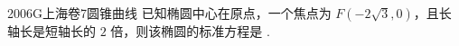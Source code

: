 
\begin{problem}{2006}{G}{上海卷}{7}{圆锥曲线}
已知椭圆中心在原点，一个焦点为 $ F(-2\sqrt{3}, 0) $，且长轴长是短轴长的 $ 2 $ 倍，则该椭圆的标准方程是 \underline{\hspace{4em}}.
\end{problem}

\begin{answer}

\end{answer}

\begin{solutions}

\end{solutions}